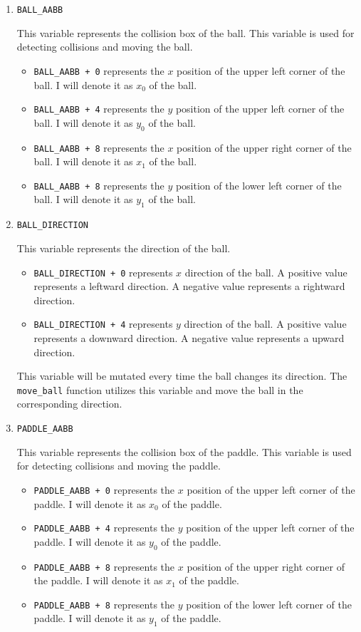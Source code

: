 \documentclass{article}
\newcommand{\code}[1]{\texttt{#1}}
\begin{document}
\begin{enumerate}
\item \code{BALL\_AABB}

This variable represents the collision box of the ball. This variable is used for detecting collisions and moving the ball.

\begin{itemize}
    \item \code{BALL\_AABB + 0} represents the $x$ position of the upper left corner of the ball. I will denote it as $x_0$ of the ball.
    \item \code{BALL\_AABB + 4} represents the $y$ position of the upper left corner of the ball. I will denote it as $y_0$ of the ball.
    \item \code{BALL\_AABB + 8} represents the $x$ position of the upper right corner of the ball. I will denote it as $x_1$ of the ball.
    \item \code{BALL\_AABB + 8} represents the $y$ position of the lower left corner of the ball. I will denote it as $y_1$ of the ball.
\end{itemize}

\item \code{BALL\_DIRECTION}

This variable represents the direction of the ball. 

\begin{itemize}
    \item \code{BALL\_DIRECTION + 0} represents $x$ direction of the ball. A positive value represents a leftward direction. A negative value represents a rightward direction.
    \item \code{BALL\_DIRECTION + 4} represents $y$ direction of the ball. A positive value represents a downward direction. A negative value represents a upward direction.
\end{itemize}

This variable will be mutated every time the ball changes its direction. The \code{move\_ball} function utilizes this variable and move the ball in the corresponding direction.

\item \code{PADDLE\_AABB}

This variable represents the collision box of the paddle. This variable is used for detecting collisions and moving the paddle.

\begin{itemize}
    \item \code{PADDLE\_AABB + 0} represents the $x$ position of the upper left corner of the paddle. I will denote it as $x_0$ of the paddle.
    \item \code{PADDLE\_AABB + 4} represents the $y$ position of the upper left corner of the paddle. I will denote it as $y_0$ of the paddle.
    \item \code{PADDLE\_AABB + 8} represents the $x$ position of the upper right corner of the paddle. I will denote it as $x_1$ of the paddle.
    \item \code{PADDLE\_AABB + 8} represents the $y$ position of the lower left corner of the paddle. I will denote it as $y_1$ of the paddle.
\end{itemize}


\end{enumerate}
\end{document}
